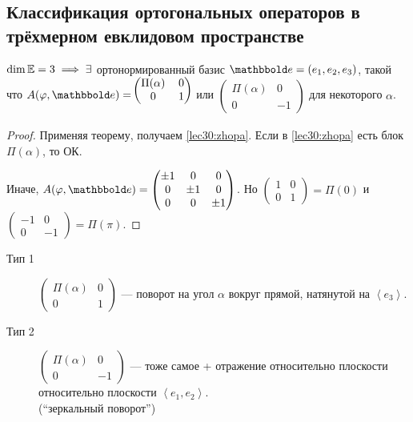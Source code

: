 \subsection{Классификация ортогональных операторов в трёхмерном евклидовом пространстве}

\begin{corollary}
    $\dim \mathbb{E} = 3 \implies \exists$ ортонормированный базис $\E = (e_1, e_2, e_3)$, такой что
    \begin{math}
        A(\phi, \E) = \begin{blockarray}{(cc)}
            \Pi(\alpha) & 0 \\
            0 & 1
        \end{blockarray}
    \end{math}
    или
    \begin{math}
        \begin{pmatrix} 
            \Pi(\alpha) & 0 \\
            0 & -1
        \end{pmatrix}
    \end{math}
    для некоторого $\alpha$.
\end{corollary}

\begin{proof}
    Применяя теорему, получаем \eqref{lec30:zhopa}. Если в \eqref{lec30:zhopa} есть блок $\Pi(\alpha)$, то ОК.

    Иначе, $A(\phi, \E) = \begin{pmatrix} \pm 1 & 0 & 0 \\ 0 & \pm 1 & 0 \\ 0 & 0 & \pm 1 \end{pmatrix}$. Но $\begin{pmatrix} 1 & 0 \\ 0 & 1 \end{pmatrix} = \Pi(0)$ и $\begin{pmatrix} -1 & 0 \\ 0 & -1 \end{pmatrix} = \Pi(\pi)$.
\end{proof}

\bigskip
\begin{description}
    \item[Тип 1] $\begin{pmatrix} \Pi(\alpha) & 0 \\ 0 & 1 \end{pmatrix}$ --- поворот на угол $\alpha$ вокруг прямой, натянутой на $\left< e_3 \right>$.
    \item[Тип 2] $\begin{pmatrix} \Pi(\alpha) & 0 \\ 0 & -1 \end{pmatrix}$ --- тоже самое + отражение относительно плоскости относительно плоскости $\left< e_1, e_2 \right>$. \\(``зеркальный поворот'')
\end{description}
